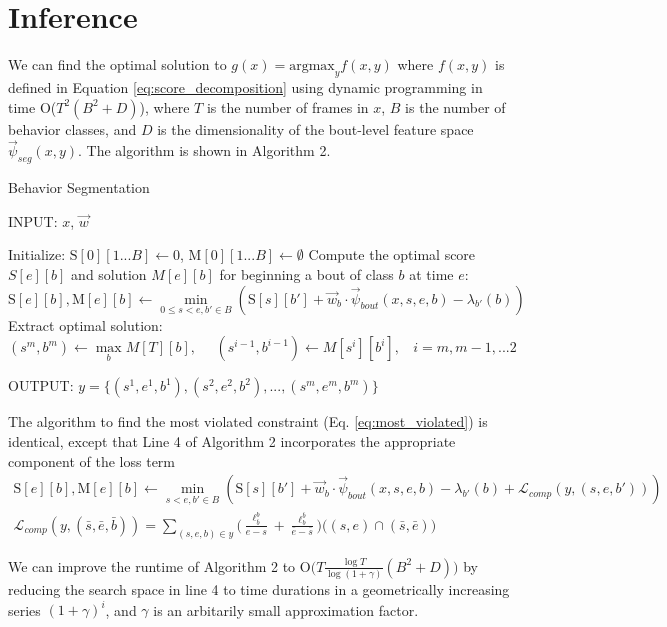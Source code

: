 \documentclass[10pt, onecolumn]{article}
\newcommand{\1}{\textbf{1}}
\begin{document}
\section{Inference}
We can find the optimal solution to $g(x) = \mathrm{argmax}_{y} f(x,y)$ where $f(x,y)$ is defined in Equation \ref{eq:score_decomposition} using dynamic programming in time O($T^2 (B^2 + D)$), where $T$ is the number of frames in $x$, $B$ is the number of behavior classes, and $D$ is the dimensionality of the bout-level feature space $\vec{\psi}_{seg}(x,y)$.  The algorithm is shown in Algorithm 2.

\begin{algorithm}[t]
\caption{Behavior Segmentation}
INPUT: $x$, $\vec{w}$
\begin{algorithmic}[1]
\STATE Initialize: $\mathrm{S}[0][1...B] \gets 0$, $\mathrm{M}[0][1...B] \gets \emptyset$
\STATE Compute the optimal score $S[e][b]$ and solution $M[e][b]$ for beginning a bout of class $b$ at time $e$:\\
{\flushright $\mathrm{S}[e][b],\mathrm{M}[e][b] \gets \min\limits_{0 \le s<e,b' \in B} \left( \mathrm{S}[s][b'] + \vec{w}_b \cdot \vec{\psi}_{bout}(x,s,e,b) - \lambda_{b'}(b) \right)$ \\}
\ENDFOR
\ENDFOR
\STATE Extract optimal solution: $(s^m,b^m) \gets \max\limits_b M[T][b],\ \ \ \ \ \ (s^{i-1},b^{i-1}) \gets M[s^{i}][b^{i}], \ \ \ \ i=m,m-1,...2$ 
\end{algorithmic}
OUTPUT: $y=\{(s^1,e^1,b^1),(s^2,e^2,b^2),...,(s^m,e^m,b^m)\}$
\end{algorithm}

The algorithm to find the most violated constraint (Eq. \ref{eq:most_violated}) is identical, except that Line 4 of Algorithm 2 incorporates the appropriate component of the loss term
\begin{eqnarray}
 \mathrm{S}[e][b],\mathrm{M}[e][b] \gets \min\limits_{s<e,b' \in B} \left( \mathrm{S}[s][b'] + \vec{w}_b \cdot \vec{\psi}_{bout}(x,s,e,b) - \lambda_{b'}(b) + \mathcal{L}_{comp}(y,(s,e,b')) \right) \\
 \mathcal{L}_{comp}(y,(\bar{s},\bar{e},\bar{b})) = \sum\limits_{(s,e,b) \in y} \bigg( \frac{\ell^b_{\bar{b}}}{e-s} + \frac{\ell^{\bar{b}}_b}{\bar{e}-\bar{s}} \bigg) \bigg( (s,e) \cap (\bar{s},\bar{e}) \bigg)
\end{eqnarray}

We can improve the runtime of Algorithm 2 to O$\big(T \frac{\log T}{\log (1+\gamma)} (B^2 + D)\big)$ by reducing the search space in line 4 to time durations in a geometrically increasing series $(1+\gamma)^i$, and $\gamma$ is an arbitarily small approximation factor.
\end{document}
